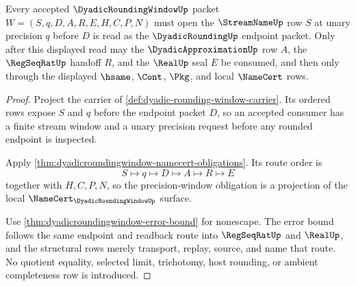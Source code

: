 \begin{theorem}
\label{thm:dyadicroundingwindow-obligation-precision-window}
Every accepted $\DyadicRoundingWindowUp$ packet
$W=(S,q,D,A,R,E,H,C,P,N)$ must open the $\StreamNameUp$ row $S$ at unary
precision $q$ before $D$ is read as the $\DyadicRoundingUp$ endpoint packet.
Only after this displayed read may the $\DyadicApproximationUp$ row $A$, the
$\RegSeqRatUp$ handoff $R$, and the $\RealUp$ seal $E$ be consumed, and then
only through the displayed $\hsame$, $\Cont$, $\Pkg$, and local $\NameCert$
rows.
\end{theorem}
\begin{proof}
Project the carrier of \autoref{def:dyadic-rounding-window-carrier}. Its
ordered rows expose $S$ and $q$ before the endpoint packet $D$, so an accepted
consumer has a finite stream window and a unary precision request before any
rounded endpoint is inspected.

Apply \autoref{thm:dyadicroundingwindow-namecert-obligations}. Its route order
is
$$
S\longmapsto q\longmapsto D\longmapsto A\longmapsto R\longmapsto E
$$
together with $H,C,P,N$, so the precision-window obligation is a projection of
the local $\NameCert_{\DyadicRoundingWindowUp}$ surface.

Use \autoref{thm:dyadicroundingwindow-error-bound} for nonescape. The error
bound follows the same endpoint and readback route into $\RegSeqRatUp$ and
$\RealUp$, and the structural rows merely transport, replay, source, and name
that route. No quotient equality, selected limit, trichotomy, host rounding, or
ambient completeness row is introduced.
\end{proof}

